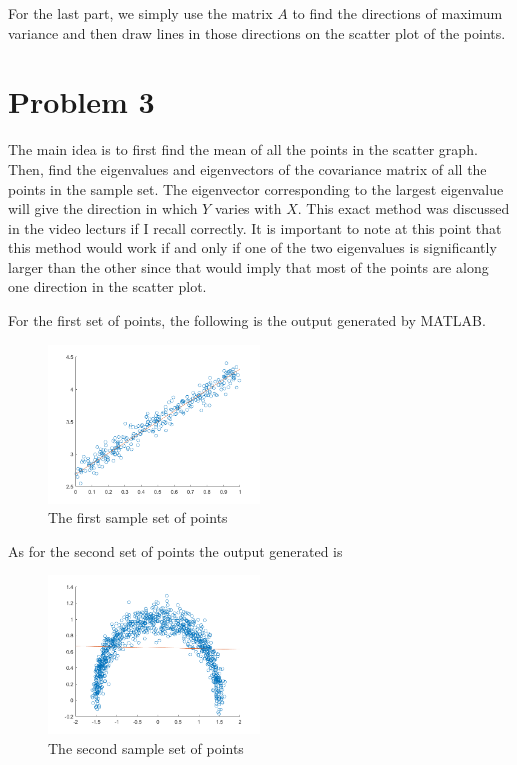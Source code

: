 \documentclass[12pt]{article}
\begin{document}
	For the last part, we simply use the matrix $A$ to find the directions of maximum variance and then draw lines in those directions on the scatter plot of the points.

	\newpage
	\section{Problem 3}
	The main idea is to first find the mean of all the points in the scatter graph. Then, find the eigenvalues and eigenvectors of the covariance matrix of all the points in the sample set. The eigenvector corresponding to the largest eigenvalue will give the direction in which $Y$ varies with $X$. This exact method was discussed in the video lecturs if I recall correctly. It is important to note at this point that this method would work if and only if one of the two eigenvalues is significantly larger than the other since that would imply that most of the points are along one direction in the scatter plot.

	For the first set of points, the following is the output generated by MATLAB.
	\begin{figure}[h]
		\includegraphics[width=0.5\textwidth]{../results/3/problem3-1.png}
		\caption{The first sample set of points}
	\end{figure}

	As for the second set of points the output generated is
	\begin{figure}[h]
		\includegraphics[width=0.5\textwidth]{../results/3/problem3-2.png}
		\caption{The second sample set of points}
	\end{figure}
\end{document}
